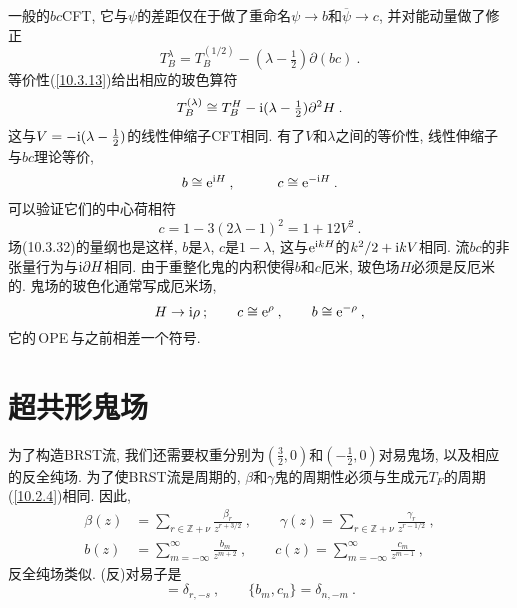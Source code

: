一般的$ bc $CFT, 它与$ \psi $的差距仅在于做了重命名$ \psi\to b $和$ \overline{\psi}\to c$, 并对能动量做了修正
\begin{equation}
    T_{B}^{\lambda} = T_{B}^{(1/2)} - (\lambda -\tfrac{1}{2})\partial(bc) \:. \label{10.3.30}
\end{equation}
等价性(\ref{10.3.13})给出相应的玻色算符
\begin{equation}
    T_{B}^{(\lambda)} \cong T_{B}^{H} -\mathrm{i} (\lambda-\tfrac{1}{2})\partial^{2}H\:. \label{10.3.31}
\end{equation}
这与$ V=-\mathrm{i}(\lambda-\tfrac{1}{2}) $的线性伸缩子CFT相同. 有了$ V $和$ \lambda $之间的等价性, 线性伸缩子与$ bc $理论等价,
\begin{equation}
    b\cong \mathrm{e}^{\mathrm{i} H} \:, \qquad \quad c\cong\mathrm{e}^{-\mathrm{i} H} \:. \label{10.3.32}
\end{equation}
可以验证它们的中心荷相符
\begin{equation}
    c=1-3(2\lambda-1)^{2}=1+12V^{2}\:. \label{10.3.33}
\end{equation}
场(10.3.32)的量纲也是这样, $b $是$ \lambda$, $c $是$ 1-\lambda$, 这与$ \mathrm{e}^{\mathrm{i} kH} $的$ k^{2}/2+\mathrm{i} kV $相同. 流$ bc $的非张量行为与$ \mathrm{i}\partial H $相同. 由于重整化鬼的内积使得$ b $和$ c $厄米, 玻色场$ H $必须是反厄米的. 鬼场的玻色化通常写成厄米场,
\begin{equation}
    H\to \mathrm{i}\rho \: ; \qquad c \cong \mathrm{e}^{\rho} \:, \qquad b\cong \mathrm{e}^{-\rho} \:,\label{10.3.34}
\end{equation}
它的\,OPE\,与之前相差一个符号.

\section{超共形鬼场}

为了构造BRST流, 我们还需要权重分别为$(\frac{3}{2},0)$和$(-\frac{1}{2},0)$对易鬼场, 以及相应的反全纯场. 为了使BRST流是周期的, $\beta $和$ \gamma $鬼的周期性必须与生成元$ T_{F} $的周期(\ref{10.2.4})相同. 因此,
\begin{subequations}
\begin{align}
    \beta(z)&=\sum_{r\in \mathds{Z}+\nu}\frac{\beta_{r}}{z^{r+3/2}}\:, \qquad 
    \gamma(z)=\sum_{r\in \mathds{Z}+\nu}\frac{\gamma_{r}}{z^{r-1/2}}\:, \label{10.4.1a} \\
    b(z)&=\sum_{m=-\infty}^{\infty}\frac{b_{m}}{z^{m+2}} \:, \qquad 
    c(z)=\sum_{m=-\infty}^{\infty}\frac{c_{m}}{z^{m-1}} \:,  \label{10.4.1b}
\end{align} \label{10.4.1}
\end{subequations}
反全纯场类似. (反)对易子是
\begin{equation}
    [\gamma_{r},\beta_{s}] =\delta_{r,-s} \:, \qquad \{b_{m},c_{n}\}=\delta_{n,-m} \:. \label{10.4.2}
\end{equation}


